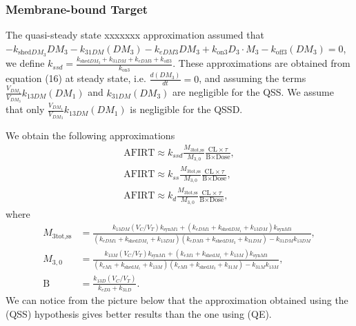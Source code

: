 \subsubsection{Membrane-bound Target}

The quasi-steady state xxxxxxx approximation assumed that $-k_{\text{shed}DM_3}DM_3-k_{31DM}(DM_3) - k_{eDM3}DM_3+k_{\text{on}3}D_3 \cdot M_3 - k_{\text{off}3}(DM_3) = 0 $, we define $k_{ssd}=\frac{k_{\text{shed}DM_3} +k_{31DM}+ k_{eDM3}+ k_{\text{off}3}}{k_{\text{on}3}}$. 
These approximations are obtained from equation (16) at steady state, i.e. $\frac{d(DM_3)}{dt}=0$, and assuming the terms $ \frac{V_{DM_1}}{V_{DM_3}}k_{13DM}(DM_1)$ and $ k_{31DM}(DM_3) $ are negligible for the QSS. We assume that only $\frac{V_{DM_1}}{V_{DM_3}}k_{13DM}(DM_1)$ is negligible for the QSSD. 

We obtain the following approximations 
\begin{align*}
\text{AFIRT} \approx k_{ssd}\frac{M_{3\text{tot,ss}}}{M_{3,0}}\frac{\text{CL}\times\tau}{\text{B}\times\text{Dose}},\\
\text{AFIRT} \approx k_{ss}\frac{M_{3\text{tot,ss}}}{M_{3,0}}\frac{\text{CL}\times\tau}{\text{B}\times\text{Dose}},\\
\text{AFIRT} \approx k_{d}\frac{M_{3\text{tot,ss}}}{M_{3,0}}\frac{\text{CL}\times\tau}{\text{B}\times\text{Dose}},
\end{align*}  
where 
\begin{align*}
M_{3\text{tot,ss}}&=\frac{k_{13DM}(V_C/V_T)k_{\text{syn}M1}+(k_{eDM1}+k_{\text{shed}DM_1}+k_{13DM})k_{\text{syn}M3}}{(k_{eDM1}+k_{\text{shed}DM_1}+k_{13DM})(k_{eDM3}+k_{\text{shed}DM_3}+k_{31DM})-k_{31DM}k_{13DM}},\\
M_{3,0}&=\frac{k_{13M}(V_C/V_T)k_{\text{syn}M1}+(k_{eM1}+k_{\text{shed}M_1}+k_{13M})k_{\text{syn}M3}}{(k_{eM1}+k_{\text{shed}M_1}+k_{13M})(k_{eM3}+k_{\text{shed}M_3}+k_{31M})-k_{31M}k_{13M}},\\
\text{B}&=\frac{k_{13D}(V_C/V_T)}{k_{eD3}+k_{31D}}.
\end{align*}
We can notice from the picture below that the approximation obtained using the (QSS) hypothesis gives better results than the one using (QE).

